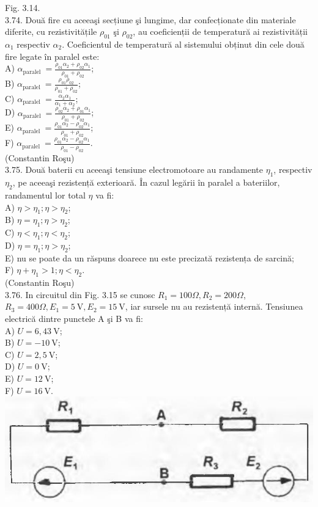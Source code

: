 \documentclass[10pt]{article}
\begin{document}
Fig. 3.14.\\
3.74. Două fire cu aceeaşi secțiune şi lungime, dar confecționate din materiale diferite, cu rezistivitățile $\rho_{01}$ şi $\rho_{02}$, au coeficienții de temperatură ai rezistivității $\alpha_{1}$ respectiv $\alpha_{2}$. Coeficientul de temperatură al sistemului obținut din cele două fire legate în paralel este:\\
A) $\alpha_{\text {paralel }}=\frac{\rho_{01} \alpha_{2}+\rho_{02} \alpha_{1}}{\rho_{01}+\rho_{02}}$;\\
B) $\alpha_{\text {paralel }}=\frac{\rho_{01} \rho_{02}}{\rho_{01}+\rho_{02}}$;\\
C) $\alpha_{\text {paralel }}=\frac{\alpha_{2} \alpha_{1}}{\alpha_{1}+\alpha_{2}}$;\\
D) $\alpha_{\text {paralel }}=\frac{\rho_{02} \alpha_{2}+\rho_{01} \alpha_{1}}{\rho_{01}+\rho_{02}}$;\\
E) $\alpha_{\text {paralel }}=\frac{\rho_{01} \alpha_{2}-\rho_{02} \alpha_{1}}{\rho_{01}+\rho_{02}}$;\\
F) $\alpha_{\text {paralel }}=\frac{\rho_{01} \alpha_{2}-\rho_{02} \alpha_{1}}{\rho_{01}-\rho_{02}}$.\\
(Constantin Roşu)\\
3.75. Două baterii cu aceeaşi tensiune electromotoare au randamente $\eta_{1}$, respectiv $\eta_{2}$, pe aceeaşi rezistență exterioară. În cazul legării în paralel a bateriilor, randamentul lor total $\eta$ va fi:\\
A) $\eta>\eta_{1} ; \eta>\eta_{2}$;\\
B) $\eta=\eta_{1} ; \eta>\eta_{2}$;\\
C) $\eta<\eta_{1} ; \eta<\eta_{2}$;\\
D) $\eta=\eta_{1} ; \eta>\eta_{2}$;\\
E) nu se poate da un răspuns doarece nu este precizată rezistența de sarcină;\\
F) $\eta+\eta_{1}>1 ; \eta<\eta_{2}$.\\
(Constantin Roşu)\\
3.76. In circuitul din Fig. 3.15 se cunosc $R_{1}=100 \Omega, R_{2}=200 \Omega$, $R_{3}=400 \Omega, E_{1}=5 \mathrm{~V}, E_{2}=15 \mathrm{~V}$, iar sursele nu au rezistență internă. Tensiunea electrică dintre punctele A şi B va fi:\\
A) $U=6,43 \mathrm{~V}$;\\
B) $U=-10 \mathrm{~V}$;\\
C) $U=2,5 \mathrm{~V}$;\\
D) $U=0 \mathrm{~V}$;\\
E) $U=12 \mathrm{~V}$;\\
F) $U=16 \mathrm{~V}$.\\
\includegraphics[max width=\textwidth, center]{2025_07_01_5b3ff9fa0d508c8e9f17g-160}
\end{document}
